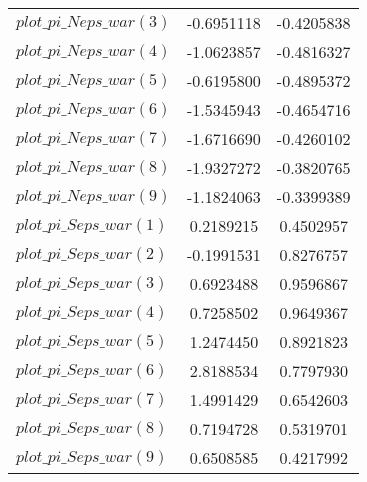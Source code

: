 \begin{center}
\begin{longtable}{lcc}
$plot\_pi\_N eps\_war (3)   $	 & 	     -0.6951118	 & 	     -0.4205838 \\ 
$plot\_pi\_N eps\_war (4)   $	 & 	     -1.0623857	 & 	     -0.4816327 \\ 
$plot\_pi\_N eps\_war (5)   $	 & 	     -0.6195800	 & 	     -0.4895372 \\ 
$plot\_pi\_N eps\_war (6)   $	 & 	     -1.5345943	 & 	     -0.4654716 \\ 
$plot\_pi\_N eps\_war (7)   $	 & 	     -1.6716690	 & 	     -0.4260102 \\ 
$plot\_pi\_N eps\_war (8)   $	 & 	     -1.9327272	 & 	     -0.3820765 \\ 
$plot\_pi\_N eps\_war (9)   $	 & 	     -1.1824063	 & 	     -0.3399389 \\ 
$plot\_pi\_S eps\_war (1)   $	 & 	      0.2189215	 & 	      0.4502957 \\ 
$plot\_pi\_S eps\_war (2)   $	 & 	     -0.1991531	 & 	      0.8276757 \\ 
$plot\_pi\_S eps\_war (3)   $	 & 	      0.6923488	 & 	      0.9596867 \\ 
$plot\_pi\_S eps\_war (4)   $	 & 	      0.7258502	 & 	      0.9649367 \\ 
$plot\_pi\_S eps\_war (5)   $	 & 	      1.2474450	 & 	      0.8921823 \\ 
$plot\_pi\_S eps\_war (6)   $	 & 	      2.8188534	 & 	      0.7797930 \\ 
$plot\_pi\_S eps\_war (7)   $	 & 	      1.4991429	 & 	      0.6542603 \\ 
$plot\_pi\_S eps\_war (8)   $	 & 	      0.7194728	 & 	      0.5319701 \\ 
$plot\_pi\_S eps\_war (9)   $	 & 	      0.6508585	 & 	      0.4217992 \\ 
\end{longtable}
 \end{center}
